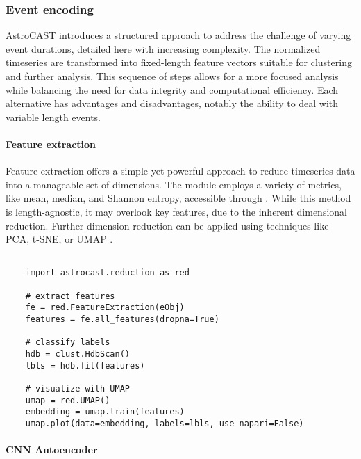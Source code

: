 \subsubsection{Event encoding}

AstroCAST introduces a structured approach to address the challenge of varying event durations, detailed here with increasing complexity. The normalized timeseries are transformed into fixed-length feature vectors suitable for clustering and further analysis. This sequence of steps allows for a more focused analysis while balancing the need for data integrity and computational efficiency. Each alternative has advantages and disadvantages, notably the ability to deal with variable length events.

\paragraph{Feature extraction}
Feature extraction offers a simple yet powerful approach to reduce timeseries data into a manageable set of dimensions. The module employs a variety of metrics, like mean, median, and Shannon entropy, accessible through . While this method is length-agnostic, it may overlook key features, due to the inherent dimensional reduction. Further dimension reduction can be applied using techniques like PCA, t-SNE, or UMAP .

\begin{lstlisting}[style=pyStyle]

    import astrocast.reduction as red

    # extract features
    fe = red.FeatureExtraction(eObj)
    features = fe.all_features(dropna=True)

    # classify labels
    hdb = clust.HdbScan()
    lbls = hdb.fit(features)

    # visualize with UMAP
    umap = red.UMAP()
    embedding = umap.train(features)
    umap.plot(data=embedding, labels=lbls, use_napari=False)

\end{lstlisting}

\paragraph{\ac{CNN} Autoencoder}

